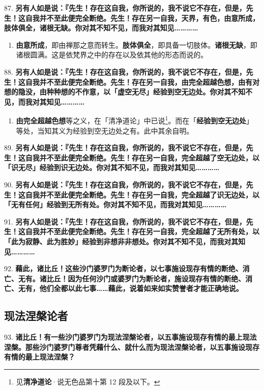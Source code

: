 {\Large 87.} \textbf{另有人如是说：『先生！存在这自我，你所说的，我不说它不存在，但是，先生！这自我并不至此便完全断绝。先生！存在另一自我，天界，有色，由意所成，肢体俱全，诸根无缺。你对其不知不见，而我对其知见…………}

\begin{enumerate}\item \textbf{由意所成}，即由禅那之意而转生。\textbf{肢体俱全}，即具备一切肢体。\textbf{诸根无缺}，即诸根圆满。这是依梵界之中的存在以及依其他的形态而说的。\end{enumerate}

{\Large 88.} \textbf{另有人如是说：『先生！存在这自我，你所说的，我不说它不存在，但是，先生！这自我并不至此便完全断绝。先生！存在另一自我，由完全超越色想，由有对想的隐没，由种种想的不作意，以「虚空无尽」经验到空无边处。你对其不知不见，而我对其知见…………}

\begin{enumerate}\item \textbf{由完全超越色想}等之义，在「清净道论」中已说\footnote{见\textbf{清净道论}·说无色品第十第 12 段及以下。}。而在「\textbf{经验到空无边处}」等处，当知其义为经验到空无边处之有。此中其余自明。\end{enumerate}

{\Large 89.} \textbf{另有人如是说：『先生！存在这自我，你所说的，我不说它不存在，但是，先生！这自我并不至此便完全断绝。先生！存在另一自我，完全超越了空无边处，以「识无尽」经验到识无边处。你对其不知不见，而我对其知见…………}

{\Large 90.} \textbf{另有人如是说：『先生！存在这自我，你所说的，我不说它不存在，但是，先生！这自我并不至此便完全断绝。先生！存在另一自我，完全超越了识无边处，以「无有任何」经验到无所有处。你对其不知不见，而我对其知见…………}

{\Large 91.} \textbf{另有人如是说：『先生！存在这自我，你所说的，我不说它不存在，但是，先生！这自我并不至此便完全断绝。先生！存在另一自我，完全超越了无所有处，以「此为寂静、此为胜妙」经验到非想非非想处。你对其不知不见，而我对其知见…………}

{\Large 92.} \textbf{藉此，诸比丘！这些沙门婆罗门为断论者，以七事施设现存有情的断绝、消亡、无有。诸比丘！因为任何沙门或婆罗门为断论者，施设现存有情的断绝、消亡、无有，他们全都以此七事……藉此，说着如来如实赞誉者才能正确地说。}

\subsection{现法涅槃论者}

{\Large 93.} \textbf{诸比丘！有一些沙门婆罗门为现法涅槃论者，以五事施设现存有情的最上现法涅槃。那些沙门婆罗门尊者凭藉什么、就什么而为现法涅槃论者，以五事施设现存有情的最上现法涅槃？}


